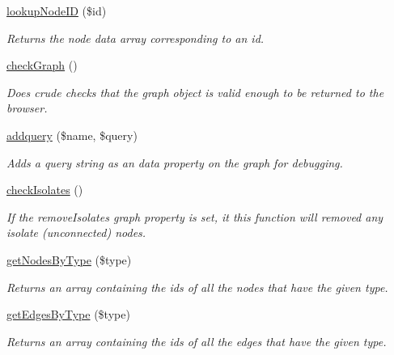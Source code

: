 \begin{DoxyCompactItemize}
\item 
\hyperlink{classGraph_a2dbdcb74c3ec884e36c7e9bd2af2894b}{lookupNodeID} (\$id)
\begin{DoxyCompactList}\small\item\em Returns the node data array corresponding to an id. \item\end{DoxyCompactList}\item 
\hyperlink{classGraph_afe74e5691b6653ac424162b5c07ffb36}{checkGraph} ()
\begin{DoxyCompactList}\small\item\em Does crude checks that the graph object is valid enough to be returned to the browser. \item\end{DoxyCompactList}\item 
\hyperlink{classGraph_ac5966cfcda85aa980d06d8e11e67612c}{addquery} (\$name, \$query)
\begin{DoxyCompactList}\small\item\em Adds a query string as an data property on the graph for debugging. \item\end{DoxyCompactList}\item 
\hyperlink{classGraph_a56a82fd5e3efba96b1eea155c8185beb}{checkIsolates} ()
\begin{DoxyCompactList}\small\item\em If the removeIsolates graph property is set, it this function will removed any isolate (unconnected) nodes. \item\end{DoxyCompactList}\item 
\hyperlink{classGraph_abf5f4c406c3eb3a82b3a2d1347715830}{getNodesByType} (\$type)
\begin{DoxyCompactList}\small\item\em Returns an array containing the ids of all the nodes that have the given type. \item\end{DoxyCompactList}\item 
\hyperlink{classGraph_a1e2982011dd121cff330730e8d561f22}{getEdgesByType} (\$type)
\begin{DoxyCompactList}\small\item\em Returns an array containing the ids of all the edges that have the given type. \item\end{DoxyCompactList}\end{DoxyCompactItemize}
